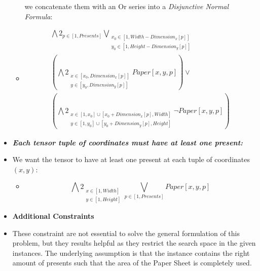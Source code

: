 \begin{itemize}
\begin{itemize}
                we concatenate them with an Or series into a \textit{Disjunctive Normal Formula}:
        \item[] \begin{equation*}\begin{multlined}
            \bigwedge2_{p \in [1, Presents]}
            \bigvee_{
                \substack{
                    x_0 \in [1, Width - Dimension_x[p]]\\
                    y_0 \in [1, Height - Dimension_y[p]]
                }
            }\\
            (\bigwedge2_{
                \substack{
                    x \in [x_0, Dimension_x[p]] \\
                    y \in [y_0, Dimension_y[p]]
                }
             } Paper[x, y, p])
             \vee \\
            (\bigwedge2_{
                \substack{
                    x \in [1, x_0] \cup [x_0 + Dimension_x[p], Width]\\
                    y \in [1, y_0] \cup [y_0 + Dimension_y[p], Height]
                }
             } \neg Paper[x, y, p]) 
        \end{multlined}\end{equation*}
    \end{itemize}
    \item \textbf{\textit{Each tensor tuple of coordinates must have at least one present:}}
    \item[] We want the tensor to have at least one present at each tuple of coordinates $(x, y)$:
    \begin{itemize}
        \item[] \begin{equation*}
            \bigwedge2_{
                \substack{
                    x \in [1, Width]\\
                    y \in [1, Height]
                }
            } \bigvee_{p \in [1, Presents]} Paper[x, y, p]
        \end{equation*}
    \end{itemize} 
    \item[] \textbf{Additional Constraints}
    \item[] These constraint are not essential to solve the general formulation of this problem,
        but they results helpful as they restrict the search space in the given instances.
        The underlying assumption is that the instance contains the right amount of presents such
        that the area of the Paper Sheet is completely used.

\end{itemize}
